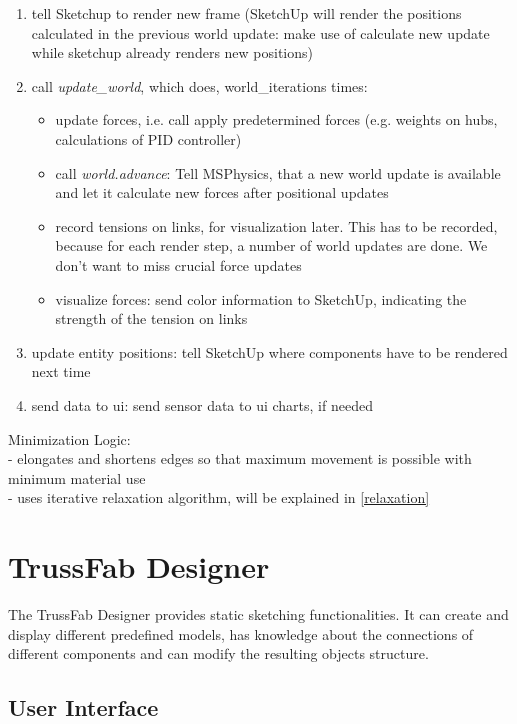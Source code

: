 \begin{enumerate}
    \item tell Sketchup to render new frame (SketchUp will render the positions calculated in the previous world update: make use of calculate new update while sketchup already renders new positions)
    \item call \textit{update\_world}, which does, world\_iterations times:
    \begin{itemize}
        \item update forces, i.e. call apply predetermined forces (e.g. weights on hubs, calculations of PID controller)
        \item call \textit{world.advance}: Tell MSPhysics, that a new world update is available and let it calculate new forces after positional updates
        \item record tensions on links, for visualization later. This has to be recorded, because for each render step, a number of world updates are done. We don't want to miss crucial force updates
        \item visualize forces: send color information to SketchUp, indicating the strength of the tension on links
    \end{itemize}
    \item update entity positions: tell SketchUp where components have to be rendered next time
    \item send data to ui: send sensor data to ui charts, if needed
\end{enumerate}
Minimization Logic:\\
- elongates and shortens edges so that maximum movement is possible with minimum material use\\
- uses iterative relaxation algorithm, will be explained in \ref{relaxation}\\

\section{TrussFab Designer}
The TrussFab Designer provides static sketching functionalities. It can create and display different predefined models, has knowledge about the connections of different components and can modify the resulting objects structure.

\subsection{User Interface}

